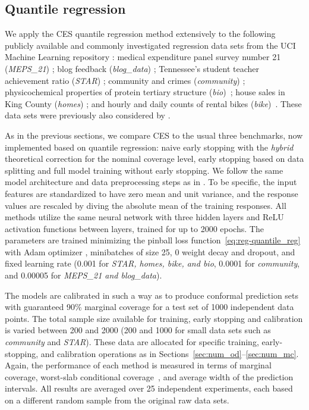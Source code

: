 \FloatBarrier

\subsection{Quantile regression} \label{app:numerical-results-cqr}

We apply the CES quantile regression method extensively to the following publicly available and commonly investigated regression data sets from the UCI Machine Learning repository \cite{Pinar2012}: medical expenditure panel survey number 21 ({\em MEPS\_21}) \cite{meps_21}; blog feedback ({\em blog\_data}) \cite{blog_data}; Tennessee’s student teacher achievement ratio ({\em STAR}) \cite{star}; community and crimes ({\em community}) \cite{community}; physicochemical properties of protein tertiary structure ({\em bio})~\cite{data-bio}; house sales in King County ({\em homes}) \cite{homes}; and hourly and daily counts of rental bikes ({\em bike})~\cite{data-bike}. These data sets were previously also considered by \citet{romano2019conformalized}.

As in the previous sections, we compare CES to the usual three benchmarks, now implemented based on quantile regression: naive early stopping with the {\em hybrid} theoretical correction for the nominal coverage level, early stopping based on data splitting and full model training without early stopping. We follow the same model architecture and data preprocessing steps as in \citet{romano2019conformalized}. To be specific, the input features are standardized to have zero mean and unit variance, and the response values are rescaled by diving the absolute mean of the training responses. All methods utilize the same neural network with three hidden layers and ReLU activation functions between layers, trained for up to 2000 epochs. The parameters are trained minimizing the pinball loss function~\ref{eq:reg-quantile_reg} with Adam optimizer \cite{kingma2014adam}, minibatches of size 25, 0 weight decay and dropout, and fixed learning rate (0.001 for {\em STAR, homes, bike, and bio}, 0.0001 for {\em community}, and 0.00005 for {\em MEPS\_21 and blog\_data}). 

The models are calibrated in such a way as to produce conformal prediction sets with guaranteed 90\% marginal coverage for a test set of 1000 independent data points. The total sample size available for training, early stopping and calibration is varied between 200 and 2000 (200 and 1000 for small data sets such as {\em community} and {\em STAR}).
These data are allocated for specific training, early-stopping, and calibration operations as in Sections~\ref{sec:num_od}--\ref{sec:num_mc}.
Again, the performance of each method is measured in terms of marginal coverage, worst-slab conditional coverage~\cite{cauchois2020knowing}, and average width of the prediction intervals. All results are averaged over 25 independent experiments, each based on a different random sample from the original raw data sets.


